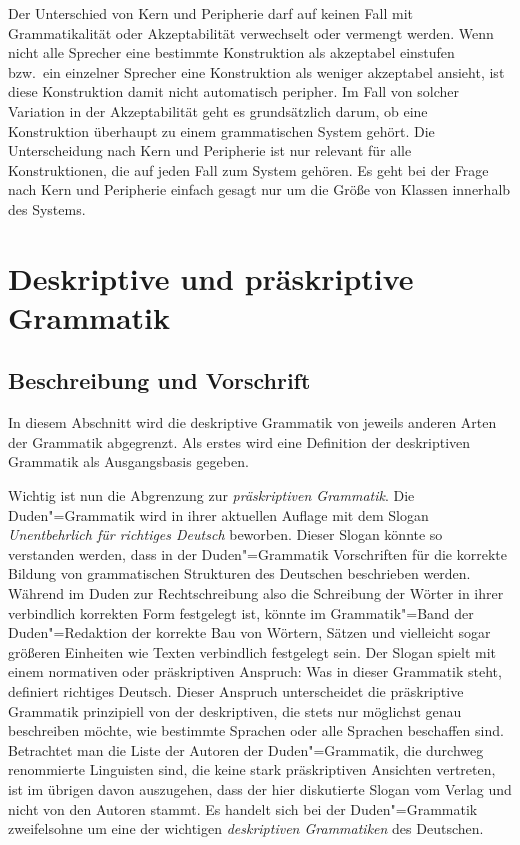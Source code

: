 
Der Unterschied von Kern und Peripherie darf auf keinen Fall mit Grammatikalität oder Akzeptabilität verwechselt oder vermengt werden.
Wenn nicht alle Sprecher eine bestimmte Konstruktion als akzeptabel einstufen bzw.\ ein einzelner Sprecher eine Konstruktion als weniger akzeptabel ansieht, ist diese Konstruktion damit nicht automatisch peripher.
Im Fall von solcher Variation in der Akzeptabilität geht es grundsätzlich darum, ob eine Konstruktion überhaupt zu einem grammatischen System gehört.
Die Unterscheidung nach Kern und Peripherie ist nur relevant für alle Konstruktionen, die auf jeden Fall zum System gehören.
Es geht bei der Frage nach Kern und Peripherie einfach gesagt nur um die Größe von Klassen innerhalb des Systems.

\section{Deskriptive und präskriptive Grammatik}

\label{sec:deskriptivnormativ}

\subsection{Beschreibung und Vorschrift}

In diesem Abschnitt wird die deskriptive Grammatik von jeweils anderen Arten der Grammatik abgegrenzt.
Als erstes wird eine Definition der deskriptiven Grammatik als Ausgangsbasis gegeben.


Wichtig ist nun die Abgrenzung zur \textit{präskriptiven Grammatik}.
Die Duden"=Grammatik \citep{Duden8} wird in ihrer aktuellen Auflage mit dem Slogan \textit{Unentbehrlich für richtiges Deutsch} beworben.
Dieser Slogan könnte so verstanden werden, dass in der Duden"=Grammatik Vorschriften für die korrekte Bildung von grammatischen Strukturen des Deutschen beschrieben werden.
Während im Duden zur Rechtschreibung also die Schreibung der Wörter in ihrer verbindlich korrekten Form festgelegt ist, könnte im Grammatik"=Band der Duden"=Redaktion der korrekte Bau von Wörtern, Sätzen und vielleicht sogar größeren Einheiten wie Texten verbindlich festgelegt sein.
Der Slogan spielt mit einem normativen oder präskriptiven Anspruch:
Was in dieser Grammatik steht, definiert richtiges Deutsch.
Dieser Anspruch unterscheidet die präskriptive Grammatik prinzipiell von der deskriptiven, die stets nur möglichst genau beschreiben möchte, wie bestimmte Sprachen oder alle Sprachen beschaffen sind.
Betrachtet man die Liste der Autoren der Duden"=Grammatik, die durchweg renommierte Linguisten sind, die keine stark präskriptiven Ansichten vertreten, ist im übrigen davon auszugehen, dass der hier diskutierte Slogan vom Verlag und nicht von den Autoren stammt. 
Es handelt sich bei der Duden"=Grammatik zweifelsohne um eine der wichtigen \textit{deskriptiven Grammatiken} des Deutschen.

